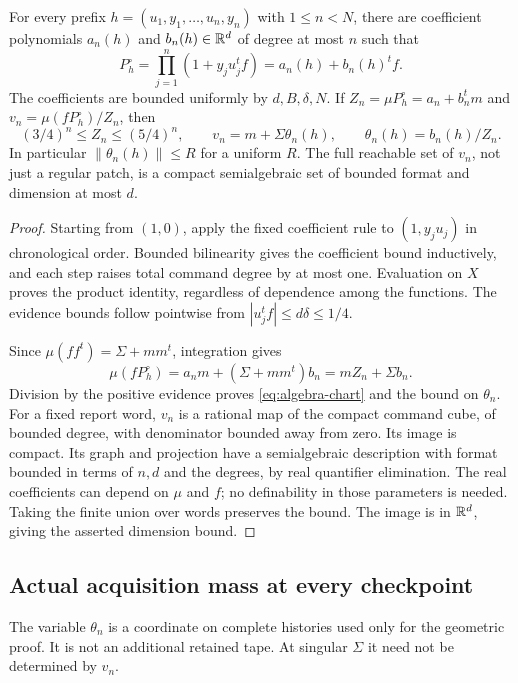 \begin{lemma}
\label{lem:algebra-product-chart}
For every prefix $h=(u_1,y_1,\ldots,u_n,y_n)$ with $1\le n<N$, there
are coefficient polynomials $a_n(h)$ and $b_n(h)\in\mathbb R^d$ of degree at
most $n$ such that
\[
 P_h^\circ=\prod_{j=1}^n(1+y_j u_j^tf)=a_n(h)+b_n(h)^tf.
\]
The coefficients are bounded uniformly by $d,B,\delta,N$. If
$Z_n=\mu P_h^\circ=a_n+b_n^tm$ and $v_n=\mu(fP_h^\circ)/Z_n$, then
\begin{equation}\label{eq:algebra-chart}
 (3/4)^n\le Z_n\le(5/4)^n,\qquad
 v_n=m+\Sigma\theta_n(h),\qquad \theta_n(h)=b_n(h)/Z_n.
\end{equation}
In particular $\|\theta_n(h)\|\le R$ for a uniform $R$.
The full reachable set of $v_n$, not just a regular patch, is a compact
semialgebraic set of bounded format and dimension at most $d$.
\end{lemma}
\begin{proof}
Starting from $(1,0)$, apply the fixed coefficient rule to
$(1,y_j u_j)$ in chronological order. Bounded bilinearity gives the
coefficient bound inductively, and each step raises total command
degree by at most one. Evaluation on $X$ proves the product identity,
regardless of dependence among the functions. The evidence bounds follow
pointwise from $|u_j^tf|\le d\delta\le1/4$.

Since $\mu(ff^t)=\Sigma+mm^t$, integration gives
\[
 \mu(fP_h^\circ)=a_nm+(\Sigma+mm^t)b_n
                       =mZ_n+\Sigma b_n.
\]
Division by the positive evidence proves \eqref{eq:algebra-chart} and
the bound on $\theta_n$. For a fixed report word, $v_n$ is a rational
map of the compact command cube, of bounded degree, with denominator
bounded away from zero. Its image is compact. Its graph and projection
have a semialgebraic description with format bounded in terms of
$n,d$ and the degrees, by real quantifier elimination. The real
coefficients can depend on $\mu$ and $f$; no definability in those
parameters is needed. Taking the finite union over words preserves the
bound. The image is in $\mathbb R^d$, giving the asserted dimension bound.
\end{proof}

\subsection{Actual acquisition mass at every checkpoint}
The variable $\theta_n$ is a coordinate on complete histories used only
for the geometric proof. It is not an additional retained tape. At
singular $\Sigma$ it need not be determined by $v_n$.

